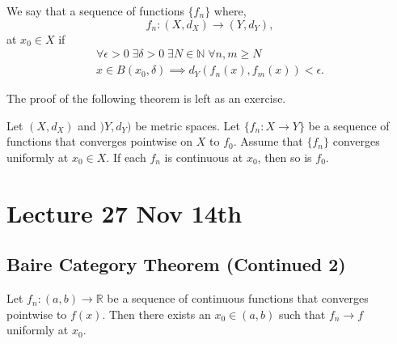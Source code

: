 \documentclass[notoc,notitlepage]{tufte-book}
\begin{document}
\begin{defn}\label{defn:uniformly_convergent_sequence_of_functions_on_a_point}
  We say that a sequence of functions $\{ f_n \}$ where,
  \begin{equation*}
    f_n : (X, d_X) \to (Y, d_Y),
  \end{equation*}
   at $x_0 \in X$ if
  \begin{gather*}
    \forall \epsilon > 0 \; \exists \delta > 0 \; \exists N \in \mathbb{N} \; \forall n, m \geq N \\
    x \in B(x_0, \delta) \implies d_Y(f_n(x), f_m(x)) < \epsilon.
  \end{gather*}
\end{defn}

The proof of the following theorem is left as an exercise.

\begin{thm}\label{thm:limit_of_sequence_of_continuous_functions_that_converges_pointwise_is_continuous}
  Let $(X, d_X)$ and $)Y, d_Y)$ be metric spaces. Let $\{ f_n : X \to Y \}$ be a sequence of functions that converges pointwise on $X$ to $f_0$. Assume that $\{ f_n \}$ converges uniformly at $x_0 \in X$. If each $f_n$ is continuous at $x_0$, then so is $f_0$.
\end{thm}



\chapter{Lecture 27 Nov 14th}%
\label{chp:lecture_27_nov_14th}

\section{Baire Category Theorem (Continued 2)}%
\label{sec:baire_category_theorem_continued_2}

\begin{thm}\label{thm:uniform_convergence_of_a_sequence_of_continuous_functions_that_converges_pointwise}
  Let $f_n : (a, b) \to \mathbb{R}$ be a sequence of continuous functions that converges pointwise to $f(x)$. Then there exists an $x_0 \in (a, b)$ such that $f_n \to f$ uniformly at $x_0$.
\end{thm}
\end{document}
